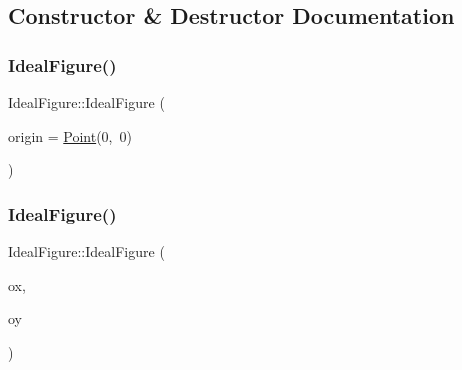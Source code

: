 \subsection{Constructor \& Destructor Documentation}
\mbox{\label{class_ideal_figure_a4df1554384722e84ffdd8c24e776b530}} 
\subsubsection{\texorpdfstring{Ideal\+Figure()}{IdealFigure()}\hspace{0.1cm}{\footnotesize\ttfamily [1/2]}}
{\footnotesize\ttfamily Ideal\+Figure\+::\+Ideal\+Figure (\begin{DoxyParamCaption}\item[{\hyperlink{class_point}{Point}}]{origin = {\ttfamily \hyperlink{class_point}{Point}(0,~0)} }\end{DoxyParamCaption})\hspace{0.3cm}{\ttfamily [inline]}}

\mbox{\label{class_ideal_figure_a35194b5caa4bec36ad18979cf9b33698}} 
\subsubsection{\texorpdfstring{Ideal\+Figure()}{IdealFigure()}\hspace{0.1cm}{\footnotesize\ttfamily [2/2]}}
{\footnotesize\ttfamily Ideal\+Figure\+::\+Ideal\+Figure (\begin{DoxyParamCaption}\item[{\hyperlink{class_point_a00b37528c0db634a12ecee9b29d79579}{Point\+::point\+Type}}]{ox,  }\item[{\hyperlink{class_point_a00b37528c0db634a12ecee9b29d79579}{Point\+::point\+Type}}]{oy }\end{DoxyParamCaption})\hspace{0.3cm}{\ttfamily [inline]}}

\mbox{\label{class_ideal_figure_a50b77911df4ac52c2aa65ab207e5a2db}} 
